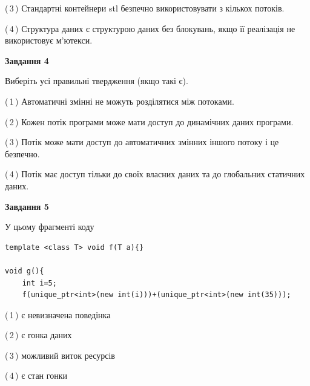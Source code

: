 \documentclass[12pt, ukrainian]{article}
\begin{document}
\begin {large}
{(\,3\,) Стандартні контейнери stl безпечно використовувати з кількох потоків.%

(\,4\,) Структура даних є структурою даних без блокувань, якщо її реалізація не використовує м’ютекси.%



\begin{center}
\textbf{Завдання 4}
\end{center}
Виберіть усі правильні твердження (якщо такі є).\par
\vspace{2mm}

(\,1\,) Автоматичні змінні не можуть розділятися між потоками.%

(\,2\,) Кожен потік програми може мати доступ до динамічних даних програми.%

(\,3\,) Потік може мати доступ до автоматичних змінних іншого потоку і це безпечно.%

(\,4\,) Потік має доступ тільки до своїх власних даних та до глобальних статичних даних.%



\begin{center}
\textbf{Завдання 5}
\end{center}
У цьому фрагменті коду
\begin{verbatim}
template <class T> void f(T a){}

void g(){
    int i=5;
    f(unique_ptr<int>(new int(i)))+(unique_ptr<int>(new int(35)));
\end{verbatim}
(\,1\,) є невизначена поведінка%

(\,2\,) є гонка даних%

(\,3\,) можливий виток ресурсів%

(\,4\,) є стан гонки%


}
\end {large}
\end{document}
